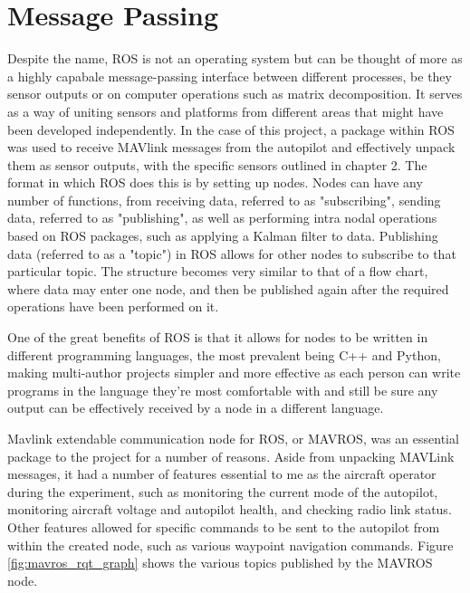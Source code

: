\documentclass[12pt]{report}
\begin{document}
\section{Message Passing}
Despite the name, ROS is not an operating system but can be thought of more as a highly capabale message-passing interface between different processes, be they sensor outputs or on computer operations such as matrix decomposition. It serves as a way of uniting sensors and platforms from different areas that might have been developed independently. In the case of this project, a package within ROS was used to receive MAVlink messages from the autopilot and effectively unpack them as sensor outputs, with the specific sensors outlined in chapter 2. The format in which ROS does this is by setting up nodes. Nodes can have any number of functions, from receiving data, referred to as "subscribing", sending data, referred to as "publishing", as well as performing intra nodal operations based on ROS packages, such as applying a Kalman filter to data. Publishing data (referred to as a "topic") in ROS allows for other nodes to subscribe to that particular topic. The structure becomes very similar to that of a flow chart, where data may enter one node, and then be published again after the required operations have been performed on it. 

One of the great benefits of ROS is that it allows for nodes to be written in different programming languages, the most prevalent being C++ and Python, making multi-author projects simpler and more effective as each person can write programs in the language they're most comfortable with and still be sure any output can be effectively received by a node in a different language. 

Mavlink extendable communication node for ROS, or MAVROS, was an essential package to the project for a number of reasons. Aside from unpacking MAVLink messages, it had a number of features essential to me as the aircraft operator during the experiment, such as monitoring the current mode of the autopilot, monitoring aircraft voltage and autopilot health, and checking radio link status. Other features allowed for specific commands to be sent to the autopilot from within the created node, such as various waypoint navigation commands. Figure \ref{fig:mavros_rqt_graph} shows the various topics published by the MAVROS node.
\end{document}
